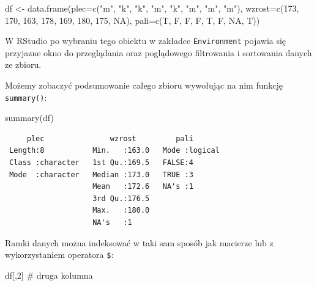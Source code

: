\documentclass[
  letterpaper,
  DIV=11,
  numbers=noendperiod]{scrreprt}
\newenvironment{Shaded}{\begin{snugshade}}{\end{snugshade}}
\newcommand{\AttributeTok}[1]{\textcolor[rgb]{0.40,0.45,0.13}{#1}}
\newcommand{\CommentTok}[1]{\textcolor[rgb]{0.37,0.37,0.37}{#1}}
\newcommand{\ConstantTok}[1]{\textcolor[rgb]{0.56,0.35,0.01}{#1}}
\newcommand{\DecValTok}[1]{\textcolor[rgb]{0.68,0.00,0.00}{#1}}
\newcommand{\FunctionTok}[1]{\textcolor[rgb]{0.28,0.35,0.67}{#1}}
\newcommand{\NormalTok}[1]{\textcolor[rgb]{0.00,0.23,0.31}{#1}}
\newcommand{\OtherTok}[1]{\textcolor[rgb]{0.00,0.23,0.31}{#1}}
\newcommand{\StringTok}[1]{\textcolor[rgb]{0.13,0.47,0.30}{#1}}
\begin{document}
\begin{Shaded}
\begin{Highlighting}[]
\NormalTok{df }\OtherTok{\textless{}{-}} \FunctionTok{data.frame}\NormalTok{(}\AttributeTok{plec=}\FunctionTok{c}\NormalTok{(}\StringTok{"m"}\NormalTok{, }\StringTok{"k"}\NormalTok{, }\StringTok{"k"}\NormalTok{, }\StringTok{"m"}\NormalTok{, }\StringTok{"k"}\NormalTok{, }\StringTok{"m"}\NormalTok{, }\StringTok{"m"}\NormalTok{, }\StringTok{"m"}\NormalTok{),}
                 \AttributeTok{wzrost=}\FunctionTok{c}\NormalTok{(}\DecValTok{173}\NormalTok{, }\DecValTok{170}\NormalTok{, }\DecValTok{163}\NormalTok{, }\DecValTok{178}\NormalTok{, }\DecValTok{169}\NormalTok{, }\DecValTok{180}\NormalTok{, }\DecValTok{175}\NormalTok{, }\ConstantTok{NA}\NormalTok{),}
                 \AttributeTok{pali=}\FunctionTok{c}\NormalTok{(T, F, F, F, T, F, }\ConstantTok{NA}\NormalTok{, T))}
\end{Highlighting}
\end{Shaded}

W RStudio po wybraniu tego obiektu w zakładce \texttt{Environment}
pojawia się przyjazne okno do przeglądania oraz poglądowego filtrowania
i sortowania danych ze zbioru.

Możemy zobaczyć podsumowanie całego zbioru wywołując na nim funkcję
\texttt{summary()}:

\begin{Shaded}
\begin{Highlighting}[]
\FunctionTok{summary}\NormalTok{(df)}
\end{Highlighting}
\end{Shaded}

\begin{verbatim}
     plec               wzrost         pali        
 Length:8           Min.   :163.0   Mode :logical  
 Class :character   1st Qu.:169.5   FALSE:4        
 Mode  :character   Median :173.0   TRUE :3        
                    Mean   :172.6   NA's :1        
                    3rd Qu.:176.5                  
                    Max.   :180.0                  
                    NA's   :1                      
\end{verbatim}

Ramki danych można indeksować w taki sam sposób jak macierze lub z
wykorzystaniem operatora \texttt{\$}:

\begin{Shaded}
\begin{Highlighting}[]
\NormalTok{df[,}\DecValTok{2}\NormalTok{] }\CommentTok{\# druga kolumna}
\end{Highlighting}
\end{Shaded}
\end{document}
